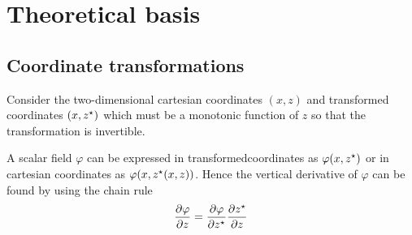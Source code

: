 \chapter{Theoretical basis}

\section{Coordinate transformations}
Consider the two-dimensional cartesian coordinates $(x, z)$ and transformed coordinates $(x, {z^\star})$ which must be a monotonic function of $z$ so that the transformation is invertible.

A scalar field $\varphi$ can be expressed in transformedcoordinates as $\varphi(x, {z^\star})$ or in cartesian coordinates as $\varphi(x, {z^\star}(x, z))$.
Hence the vertical derivative of $\varphi$ can be found by using the chain rule
\begin{align}
  \frac{\partial \varphi}{\partial z} =
  \frac{\partial \varphi}{\partial {z^\star}}
  \frac{\partial {z^\star}}{\partial z}
\end{align}


